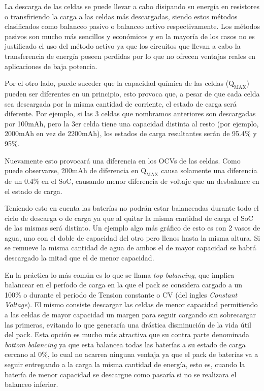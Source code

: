 \documentclass[10pt,a4paper]{article}
\begin{document}
	La descarga de las celdas se puede llevar a cabo disipando su energía en resistores o transfiriendo la carga a las celdas más descargadas, siendo estos métodos clasificados como balanceo pasivo o balanceo activo respectivamente. Los métodos pasivos son mucho más sencillos y económicos y en la mayoría de los casos no es justificado el uso del método activo ya que los circuitos que llevan a cabo la transferencia de energía poseen perdidas por lo que no ofrecen ventajas reales en aplicaciones de baja potencia.
	
	Por el otro lado, puede suceder que la capacidad química de las celdas 
    ($\mathrm{Q_{MAX}}$) pueden ser diferentes en un principio, esto provoca 
    que, a pesar de que cada celda sea descargada por la misma cantidad de 
    corriente, el estado de carga será diferente. Por ejemplo, si las 3 celdas 
    que nombramos anteriores son descargadas por 100mAh, pero la 3er celda 
    tiene una capacidad distinta al resto (por ejemplo, 2000mAh en vez de 
    2200mAh), los estados de carga resultantes serán de 95.4\% y 95\%.
	
	Nuevamente esto provocará una diferencia en los OCVs de las celdas. 
    Como puede observarse, 200mAh de diferencia en $\mathrm{Q_{MAX}}$ causa 
    solamente una diferencia de un 0.4\% en el SoC, causando menor diferencia de 
    voltaje que un desbalance en el estado de carga.
	
	Teniendo esto en cuenta las baterías no podrán estar balanceadas durante 
    todo el ciclo de descarga o de carga ya que al quitar la misma cantidad de 
    carga el SoC de las mismas será distinto. Un ejemplo algo más gráfico de 
    esto es con 2 vasos de agua, uno con el doble de capacidad del otro pero 
    llenos hasta la misma altura. Si se remueve la misma cantidad de agua de 
    ambos el de mayor capacidad se habrá descargado la mitad que el de menor 
    capacidad.
	
	En la práctica lo más común es lo que se llama \emph{top balancing}, que 
    implica balancear en el período de carga en la que el pack se considera
    cargado a un 100\% o durante el periodo de Tension constante o CV (del
    ingles \emph{Constant Voltage}). El mismo consiste descargar las celdas de 
    menor capacidad permitiendo a las celdas de mayor capacidad un margen para 
    seguir cargando sin sobrecargar las primeras, evitando lo que generaría una 
    drástica disminución de la vida útil del pack. Esta opción es mucho más 
    atractiva que su contra parte denominada \emph{bottom balancing} ya que 
    esta balancea todas las baterías a su estado de carga cercano al 0\%, lo 
    cual no acarrea ninguna ventaja ya que el pack de baterías va a seguir 
    entregando a la carga la misma cantidad de energía, esto es, cuando la 
    batería de menor capacidad se descargue como pasaría si no se realizara el 
    balanceo inferior.
	
\end{document}
